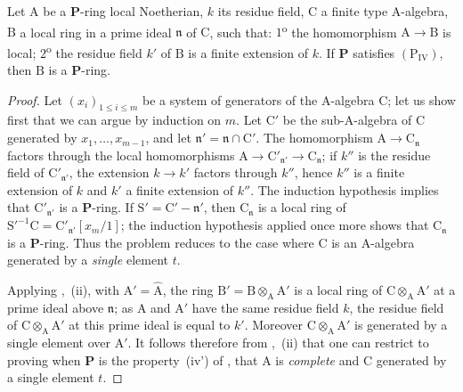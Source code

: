 \begin{lemma}[7.4.4.1]
\label{IV.7.4.4.1}
Let $\mathrm{A}$ be a $\boldsymbol{P}$-ring local Noetherian, $k$ its residue field, $\mathrm{C}$ a finite type A-algebra, $\mathrm{B}$ a local ring in a prime ideal $\mathfrak{n}$ of $\mathrm{C}$, such that:
$1$\textsuperscript{o} the homomorphism $\mathrm{A}\to\mathrm{B}$ is local; $2$\textsuperscript{o} the residue field $k'$ of $\mathrm{B}$ is a finite extension of $k$.
If $\boldsymbol{P}$ satisfies $(\mathrm{P_{IV}})$, then $\mathrm{B}$ is a $\boldsymbol{P}$-ring.
\end{lemma}

\begin{proof}
Let $(x_i)_{1\leqslant i\leqslant m}$ be a system of generators of the $\mathrm{A}$-algebra $\mathrm{C}$; let us show first that we can argue by induction on $m$.
Let $\mathrm{C}'$ be the sub-$\mathrm{A}$-algebra of $\mathrm{C}$ generated by $x_1,\ldots,x_{m-1}$, and let $\mathfrak{n}'=\mathfrak{n}\cap\mathrm{C}'$.
The homomorphism $\mathrm{A}\to\mathrm{C}_\mathfrak{n}$ factors through the local homomorphisms $\mathrm{A}\to\mathrm{C}'_{\mathfrak{n}'}\to\mathrm{C}_\mathfrak{n}$; if $k''$ is the residue field of $\mathrm{C}'_{\mathfrak{n}'}$, the extension $k\to k'$ factors through $k''$, hence $k''$ is a finite extension of $k$ and $k'$ a finite extension of $k''$.
The induction hypothesis implies that $\mathrm{C}'_{\mathfrak{n}'}$ is a $\boldsymbol{P}$-ring. If $\mathrm{S}'=\mathrm{C}'-\mathfrak{n}'$, then $\mathrm{C}_\mathfrak{n}$ is a local ring of $\mathrm{S}'^{-1}\mathrm{C}=\mathrm{C}'_{\mathfrak{n}'}[x_m/1]$; the induction hypothesis applied once more shows that $\mathrm{C}_\mathfrak{n}$ is a $\boldsymbol{P}$-ring. Thus the problem reduces to the case where $\mathrm{C}$ is an $\mathrm{A}$-algebra generated by a \emph{single} element $t$.

Applying ,~(ii), with $\mathrm{A}'=\widehat{\mathrm{A}}$, the ring $\mathrm{B}'=\mathrm{B}\otimes_\mathrm{A}\mathrm{A}'$ is a local ring of $\mathrm{C}\otimes_\mathrm{A}\mathrm{A}'$ at a prime ideal above $\mathfrak{n}$; as $\mathrm{A}$ and $\mathrm{A}'$ have the same residue field $k$, the residue field of $\mathrm{C}\otimes_\mathrm{A}\mathrm{A}'$ at this prime ideal is equal to $k'$.
Moreover $\mathrm{C}\otimes_\mathrm{A}\mathrm{A}'$ is generated by a single element over $\mathrm{A}'$.
It follows therefore from ,~(ii) that one can restrict to proving  when $\boldsymbol{P}$ is the property~(iv') of , that $\mathrm{A}$ is \emph{complete} and $\mathrm{C}$ generated by a single element $t$.


\end{proof}
